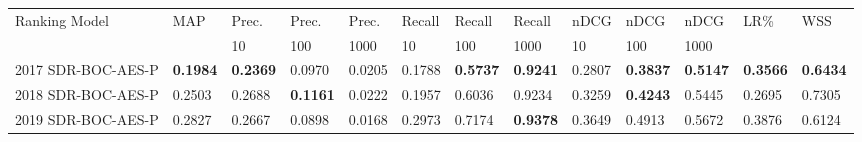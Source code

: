 \begin{tabular}{l|l|lll|lll|lll|l|l}
	
	\toprule
Ranking Model&MAP&Prec.&Prec.&Prec.&Recall&Recall&Recall&nDCG&nDCG&nDCG&LR\%&WSS\\
& &10&100&1000&10&100&1000&10&100&1000& &  \\
 \hline
2017 SDR-BOC-AES-P&\textbf{0.1984}&\textbf{0.2369}&0.0970&0.0205&0.1788&\textbf{0.5737}&\textbf{0.9241}&0.2807&\textbf{0.3837}&\textbf{0.5147}&\textbf{0.3566}&\textbf{0.6434}\\
2018 SDR-BOC-AES-P&0.2503&0.2688&\textbf{0.1161}&0.0222&0.1957&0.6036&0.9234&0.3259&\textbf{0.4243}&0.5445&0.2695&0.7305\\
2019 SDR-BOC-AES-P&0.2827&0.2667&0.0898&0.0168&0.2973&0.7174&\textbf{0.9378}&0.3649&0.4913&0.5672&0.3876&0.6124\\
	\bottomrule
\end{tabular}
